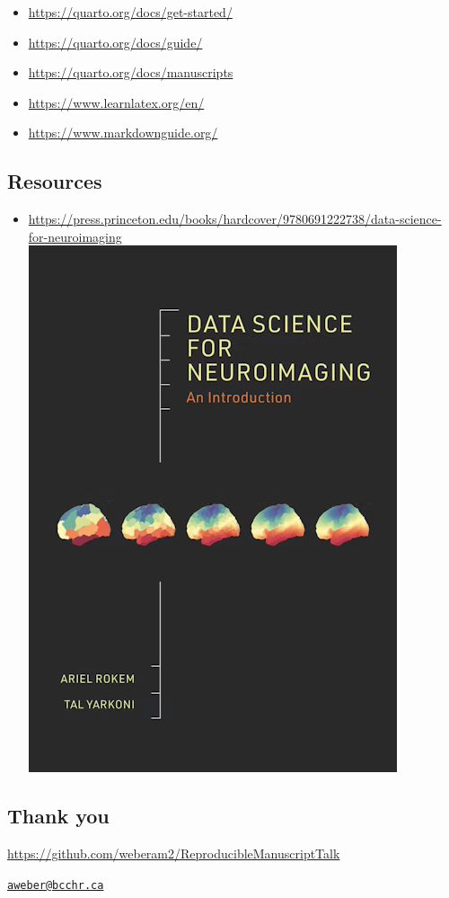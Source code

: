 \documentclass[
  letterpaper,
  DIV=11,
  numbers=noendperiod]{scrartcl}
\providecommand{\tightlist}{%
  \setlength{\itemsep}{0pt}\setlength{\parskip}{0pt}}\usepackage{longtable,booktabs,array}
\begin{document}
\begin{itemize}
\item
   \url{https://quarto.org/docs/get-started/}
\item
   \url{https://quarto.org/docs/guide/}
\item
   \url{https://quarto.org/docs/manuscripts}
\item
   \url{https://www.learnlatex.org/en/}
\item
   \url{https://www.markdownguide.org/}
\end{itemize}

\subsection{Resources}\label{resources-1}

\begin{itemize}
\tightlist
\item
  \url{https://press.princeton.edu/books/hardcover/9780691222738/data-science-for-neuroimaging}
  \includegraphics{img/datascienceneuroimag.png}
\end{itemize}

\subsection{Thank you}\label{thank-you}

\url{https://github.com/weberam2/ReproducibleManuscriptTalk}

\href{mailto:aweber@bcchr.ca}{\nolinkurl{aweber@bcchr.ca}}
\end{document}
